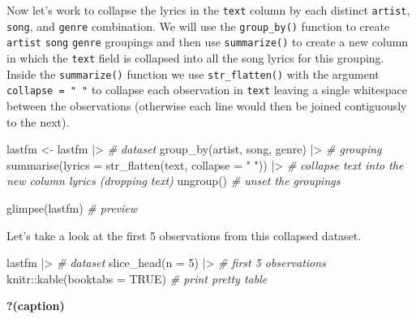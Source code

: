 \documentclass[
  letterpaper,
  DIV=11,
  numbers=noendperiod]{scrreport}
\newenvironment{Shaded}{\begin{snugshade}}{\end{snugshade}}
\newcommand{\AttributeTok}[1]{\textcolor[rgb]{0.00,0.00,0.00}{#1}}
\newcommand{\CommentTok}[1]{\textcolor[rgb]{0.00,0.00,0.00}{\textit{#1}}}
\newcommand{\ConstantTok}[1]{\textcolor[rgb]{0.00,0.00,0.00}{#1}}
\newcommand{\DecValTok}[1]{\textcolor[rgb]{0.00,0.00,0.00}{#1}}
\newcommand{\FunctionTok}[1]{\textcolor[rgb]{0.00,0.00,0.00}{#1}}
\newcommand{\NormalTok}[1]{\textcolor[rgb]{0.00,0.00,0.00}{#1}}
\newcommand{\OtherTok}[1]{\textcolor[rgb]{0.00,0.00,0.00}{#1}}
\newcommand{\SpecialCharTok}[1]{\textcolor[rgb]{0.00,0.00,0.00}{#1}}
\newcommand{\StringTok}[1]{\textcolor[rgb]{0.00,0.00,0.00}{#1}}
\theoremstyle{definition}
\theoremstyle{remark}
\begin{document}
Now let's work to collapse the lyrics in the \texttt{text} column by
each distinct \texttt{artist}, \texttt{song}, and \texttt{genre}
combination. We will use the \texttt{group\_by()} function to create
\texttt{artist} \texttt{song} \texttt{genre} groupings and then use
\texttt{summarize()} to create a new column in which the \texttt{text}
field is collapsed into all the song lyrics for this grouping. Inside
the \texttt{summarize()} function we use \texttt{str\_flatten()} with
the argument \texttt{collapse\ =\ "\ "} to collapse each observation in
\texttt{text} leaving a single whitespace between the observations
(otherwise each line would then be joined contiguously to the next).

\begin{Shaded}
\begin{Highlighting}[]
\NormalTok{lastfm }\OtherTok{\textless{}{-}} 
\NormalTok{  lastfm }\SpecialCharTok{|\textgreater{}} \CommentTok{\# dataset}
  \FunctionTok{group\_by}\NormalTok{(artist, song, genre) }\SpecialCharTok{|\textgreater{}} \CommentTok{\# grouping}
  \FunctionTok{summarise}\NormalTok{(}\AttributeTok{lyrics =} \FunctionTok{str\_flatten}\NormalTok{(text, }\AttributeTok{collapse =} \StringTok{" "}\NormalTok{)) }\SpecialCharTok{|\textgreater{}}  \CommentTok{\# collapse text into the new column \textasciigrave{}lyrics\textasciigrave{} (dropping \textasciigrave{}text\textasciigrave{})}
  \FunctionTok{ungroup}\NormalTok{() }\CommentTok{\# unset the groupings}

\FunctionTok{glimpse}\NormalTok{(lastfm) }\CommentTok{\# preview}
\end{Highlighting}
\end{Shaded}

Let's take a look at the first 5 observations from this collapsed
dataset.

\begin{Shaded}
\begin{Highlighting}[]
\NormalTok{lastfm }\SpecialCharTok{|\textgreater{}} \CommentTok{\# dataset}
  \FunctionTok{slice\_head}\NormalTok{(}\AttributeTok{n =} \DecValTok{5}\NormalTok{) }\SpecialCharTok{|\textgreater{}} \CommentTok{\# first 5 observations}
\NormalTok{  knitr}\SpecialCharTok{::}\FunctionTok{kable}\NormalTok{(}\AttributeTok{booktabs =} \ConstantTok{TRUE}\NormalTok{) }\CommentTok{\# print pretty table}
\end{Highlighting}
\end{Shaded}

\begin{table}

\caption{\textbf{?(caption)}}

\end{table}
\end{document}
